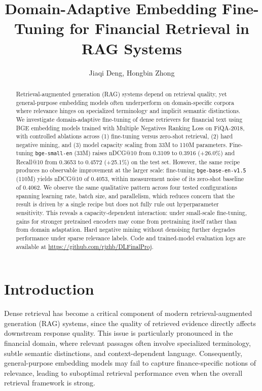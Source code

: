 \documentclass{article} %
\title{Domain-Adaptive Embedding Fine-Tuning for Financial Retrieval in RAG Systems}
\author{Jiaqi Deng, Hongbin Zhong}
\begin{document}
\maketitle

\begin{abstract}
Retrieval-augmented generation (RAG) systems depend on retrieval quality, yet general-purpose embedding models often underperform on domain-specific corpora where relevance hinges on specialized terminology and implicit semantic distinctions.
We investigate domain-adaptive fine-tuning of dense retrievers for financial text using BGE embedding models trained with Multiple Negatives Ranking Loss on FiQA-2018, with controlled ablations across (1) fine-tuning versus zero-shot retrieval, (2) hard negative mining, and (3) model capacity scaling from 33M to 110M parameters.
Fine-tuning \texttt{bge-small-en} (33M) raises nDCG@10 from 0.3109 to 0.3916 (+26.0\%) and Recall@10 from 0.3653 to 0.4572 (+25.1\%) on the test set.
However, the same recipe produces no observable improvement at the larger scale: fine-tuning \texttt{bge-base-en-v1.5} (110M) yields nDCG@10 of 0.4053, within measurement noise of its zero-shot baseline of 0.4062.
We observe the same qualitative pattern across four tested configurations spanning learning rate, batch size, and parallelism, which reduces concern that the result is driven by a single recipe but does not fully rule out hyperparameter sensitivity.
This reveals a capacity-dependent interaction: under small-scale fine-tuning, gains for stronger pretrained encoders may come from pretraining itself rather than from domain adaptation.
Hard negative mining without denoising further degrades performance under sparse relevance labels.
Code and trained-model evaluation logs are available at \url{https://github.com/rjzhb/DLFinalProj}.
\end{abstract}

\section{Introduction}

Dense retrieval has become a critical component of modern retrieval-augmented generation (RAG) systems, since the quality of retrieved evidence directly affects downstream response quality.
This issue is particularly pronounced in the financial domain, where relevant passages often involve specialized terminology, subtle semantic distinctions, and context-dependent language.
Consequently, general-purpose embedding models may fail to capture finance-specific notions of relevance, leading to suboptimal retrieval performance even when the overall retrieval framework is strong.
\end{document}
